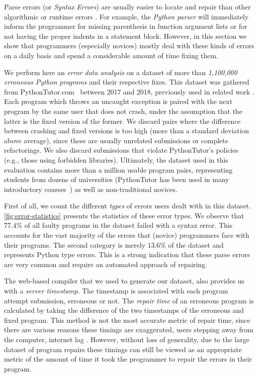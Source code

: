 Parse errors (or \emph{Syntax Errors}) are usually easier to locate and repair
than other algorithmic or runtime errors \citep{Denny_2012}. For example, the
\emph{Python parser} will immediately inform the programmer for missing
parenthesis in function argument lists or for not having the proper indents in a
statement block. However, in this section we show that programmers (especially
novices) mostly deal with these kinds of errors on a daily basis and spend a
considerable amount of time fixing them.

We perform here an \emph{error data analysis} on a \python dataset of more
than \emph{1,100,000 erroneous Python programs} and their respective fixes. This
dataset was gathered from PythonTutor.com~\citep{Guo2013} between 2017 and 2018,
previously used in related work \citep{Endres2019, Cosman2020}. Each program
which throws an uncaught \python exception is paired with the next program by
the same user that does not crash, under the assumption that the latter is the
fixed version of the former. We discard pairs where the difference between
crashing and fixed versions is too high (more than a standard deviation above
average), since these are usually unrelated submissions or complete
refactorings. We also discard submissions that violate PythonTutor's policies
(e.g., those using forbidden libraries). Ultimately, the dataset used in this
evaluation contains more than a million usable program pairs, representing
students from dozens of universities (PythonTutor has been used in many
introductory courses~\citep{Guo2013}) as well as non-traditional novices.

First of all, we count the different \emph{types} of errors users dealt with in
this dataset. \autoref{fig:error-statistics} presents the statistics of these
error types. We observe that $77.4 \% $ of all faulty programs in the dataset
failed with a syntax error. This accounts for the vast majority of the errors
that (novice) programmers face with their programs. The second category is
merely $13.6\%$ of the dataset and represents Python type errors. This is a
strong indication that these parse errors are very common and require an
automated approach of repairing.

The web-based compiler that we used to generate our dataset, also provides us
with a \emph{server timestamp}. The timestamp is associated with each program
attempt submission, erroneous or not. The \emph{repair time} of an erroneous
program is calculated by taking the difference of the two timestamps of the
erroneous and fixed program. This method is not the most accurate metric of
repair time, since there are various reasons these timings are exaggerated, \eg
users stepping away from the computer, internet lag \etc. However, without loss
of generality, due to the large dataset of program repairs these timings can
still be viewed as an appropriate metric of the amount of time it took the
programmer to repair the errors in their program.

